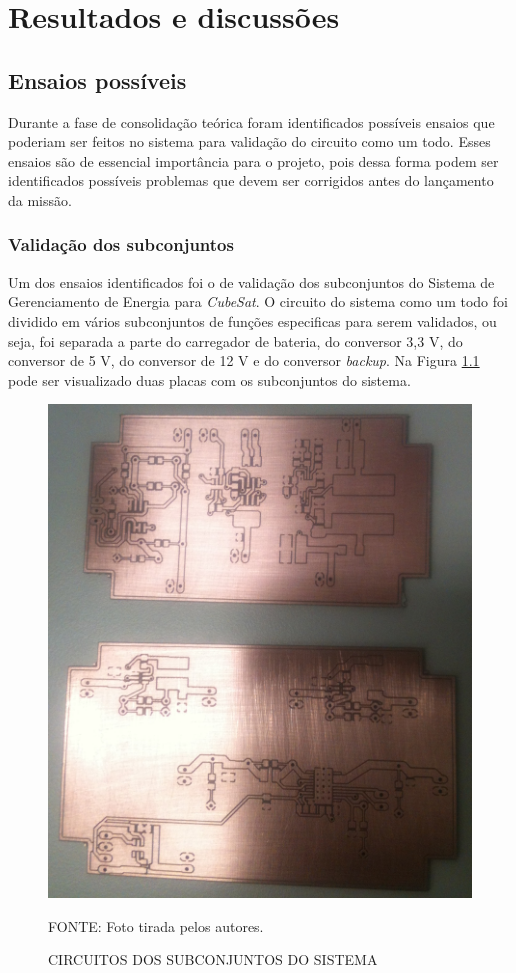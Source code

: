 \documentclass[
	12pt,				%
	openright,			%
	oneside,			%
	a4paper,			%
	english,			%
	french,				%
	spanish,			%
	brazil,				%
	oldfontcommands
	]{abntex2}
\begin{document}
\chapter[Resultados e discussões]{Resultados e discussões}

\section[Ensaios possíveis]{Ensaios possíveis}
	
	Durante a fase de consolidação teórica foram identificados possíveis ensaios que poderiam ser feitos no sistema para validação do circuito como um todo. Esses ensaios são de essencial importância para o projeto, pois dessa forma podem ser identificados possíveis problemas que devem ser corrigidos antes do lançamento da missão.
	
\subsection[Validação dos subconjuntos]{Validação dos subconjuntos}

	Um dos ensaios identificados foi o de validação dos subconjuntos do Sistema de Gerenciamento de Energia para \textit{CubeSat}. O circuito do sistema como um todo foi dividido em vários subconjuntos de funções especificas para serem validados, ou seja, foi separada a parte do carregador de bateria, do conversor 3,3 V, do conversor de 5 V, do conversor de 12 V e do conversor \textit{backup}. Na Figura \ref{Fig_SubConj} pode ser visualizado duas placas com os subconjuntos do sistema.
	
	\begin{figure}[th]
		\caption{CIRCUITOS DOS SUBCONJUNTOS DO SISTEMA}
		\label{Fig_SubConj}
		\centering
		\includegraphics[width=0.7\linewidth]{./figs/placas_subconjuntos}
			
		\begin{small}
			FONTE: Foto tirada pelos autores.
		\end{small}		
	\end{figure}
	
\end{document}
